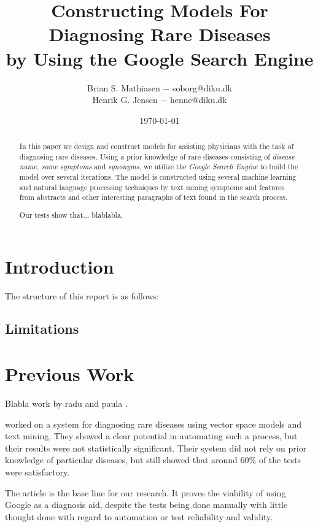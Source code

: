 \documentclass[10pt,letterpaper,final]{article}
\title{Constructing Models For Diagnosing Rare Diseases\\
        \small{by Using the Google Search Engine}}
\author{Brian S. Mathiasen $-$ soborg@diku.dk \\
        Henrik G. Jensen $-$ henne@diku.dk\\
}
\date{\today} %
\begin{document}
\maketitle
\listoffixmes


\begin{abstract}
In this paper we design and construct models for assisting physicians
with the task of diagnosing rare diseases. Using a prior knowledge of
rare diseases consisting of \textit{disease name, some symptoms} and
\textit{synonyms}, we utilize the \textit{Google Search Engine} to build
the model over several iterations. The model is constructed using
several machine learning and natural language processing techniques by
text mining symptoms and features from abstracts and other interesting
paragraphs of text found in the search process.

Our tests show that... blablabla, 
\end{abstract}
\section{Introduction}
\label{chap:introduction}


The structure of this report is as follows:

\subsection{Limitations}


\section{Previous Work}
Blabla work by radu and paula \cite{radupaula}.


\cite{jensenandersen} worked on a system for diagnosing rare diseases
using vector space models and text mining. They showed a clear potential
in automating such a process, but their results were not statistically
significant. Their system did not rely on prior knowledge of particular
diseases, but still showed that around 60\% of the tests were
satisfactory.


The article \cite{googlingdiagnosis} is the base line for our research.
It proves the viability of using Google as a diagnosis aid, despite the
tests being done manually with little thought done with regard to
automation or test reliability and validity.
\end{document}
